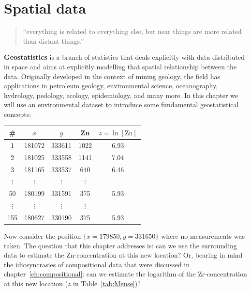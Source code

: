 \chapter{Spatial data}
\label{ch:spatial}

\begin{quotation}
  ``everything is related to everything else, but near things are more related than distant things.''
\end{quotation}

\textbf{Geostatistics} is a branch of statistics that deals explicitly
with data distributed in space and aims at explicitly modelling that
spatial relationship between the data. Originally developed in the
context of mining geology, the field has applications in petroleum
geology, environmental science, oceanography, hydrology, pedology,
ecology, epidemiology, and many more. In this chapter we will use an
environmental dataset to introduce some fundamental geostatistical
concepts:

\begin{center}
\begin{tabular}{c|cccc}
\#  & $x$    & $y$    & Zn & $z=\ln[\mbox{Zn}]$\\ \hline
1   & 181072 & 333611 & 1022 & 6.93 \\     
2   & 181025 & 333558 & 1141 & 7.04 \\
3   & 181165 & 333537 & 640  & 6.46 \\
$\vdots$ & $\vdots$ & $\vdots$ & $\vdots$ \\
50  & 180199 & 331591 & 375  & 5.93 \\
$\vdots$ & $\vdots$ & $\vdots$ & $\vdots$ \\
155 & 180627 & 330190 & 375  & 5.93 \\
\end{tabular}
\label{tab:Meuse}
\end{center}

Now consider the position $\{x=179850,y=331650\}$ where no measurements
was taken. The question that this chapter addresses is: can we use the
surrounding data to estimate the Zn-concentration at this new
location? Or, bearing in mind the idiosyncrasies of compositional data
that were discussed in chapter~\ref{ch:compositional}: can we estimate
the logarithm of the Zr-concentration at this new location
($z$ in Table~\ref{tab:Meuse})?

